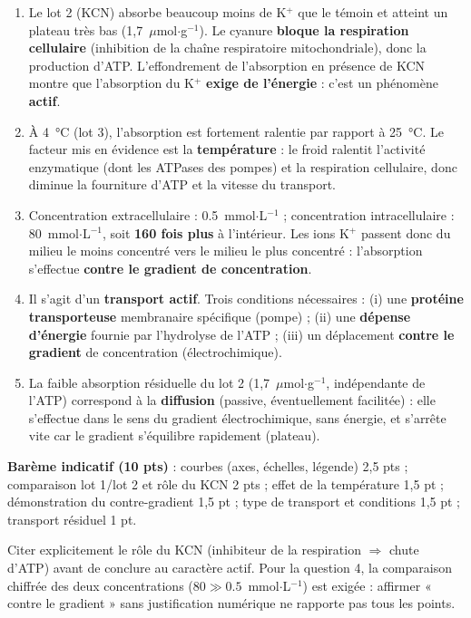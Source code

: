 \documentclass[11pt]{article}
\begin{document}
\begin{corrige}
\begin{enumerate}
\item Le lot 2 (KCN) absorbe beaucoup moins de K$^+$ que le témoin et atteint un plateau très bas (1,7~$\mu$mol$\cdot$g$^{-1}$). Le cyanure \textbf{bloque la respiration cellulaire} (inhibition de la chaîne respiratoire mitochondriale), donc la production d'ATP. L'effondrement de l'absorption en présence de KCN montre que l'absorption du K$^+$ \textbf{exige de l'énergie} : c'est un phénomène \textbf{actif}.
\item À \SI{4}{\celsius} (lot 3), l'absorption est fortement ralentie par rapport à \SI{25}{\celsius}. Le facteur mis en évidence est la \textbf{température} : le froid ralentit l'activité enzymatique (dont les ATPases des pompes) et la respiration cellulaire, donc diminue la fourniture d'ATP et la vitesse du transport.
\item Concentration extracellulaire : \num{0,5}~mmol$\cdot$L$^{-1}$ ; concentration intracellulaire : \num{80}~mmol$\cdot$L$^{-1}$, soit \textbf{160 fois plus} à l'intérieur. Les ions K$^+$ passent donc du milieu le moins concentré vers le milieu le plus concentré : l'absorption s'effectue \textbf{contre le gradient de concentration}.
\item Il s'agit d'un \textbf{transport actif}. Trois conditions nécessaires : (i) une \textbf{protéine transporteuse} membranaire spécifique (pompe) ; (ii) une \textbf{dépense d'énergie} fournie par l'hydrolyse de l'ATP ; (iii) un déplacement \textbf{contre le gradient} de concentration (électrochimique).
\item La faible absorption résiduelle du lot 2 (1,7~$\mu$mol$\cdot$g$^{-1}$, indépendante de l'ATP) correspond à la \textbf{diffusion} (passive, éventuellement facilitée) : elle s'effectue dans le sens du gradient électrochimique, sans énergie, et s'arrête vite car le gradient s'équilibre rapidement (plateau).
\end{enumerate}
\textbf{Barème indicatif (10 pts)} : courbes (axes, échelles, légende) 2,5 pts ; comparaison lot 1/lot 2 et rôle du KCN 2 pts ; effet de la température 1,5 pt ; démonstration du contre-gradient 1,5 pt ; type de transport et conditions 1,5 pt ; transport résiduel 1 pt.
\end{corrige}

\begin{attention}
Citer explicitement le rôle du KCN (inhibiteur de la respiration $\Rightarrow$ chute d'ATP) avant de conclure au caractère actif. Pour la question 4, la comparaison chiffrée des deux concentrations ($\num{80} \gg \num{0,5}$~mmol$\cdot$L$^{-1}$) est exigée : affirmer « contre le gradient » sans justification numérique ne rapporte pas tous les points.
\end{attention}
\end{document}
